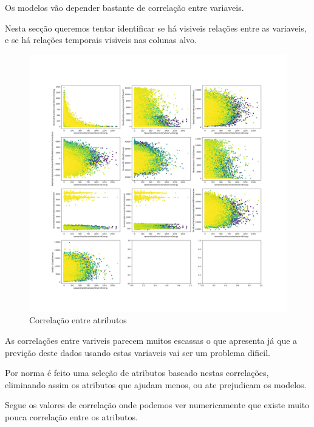 Os modelos vão depender bastante de correlação entre variaveis.

Nesta secção queremos tentar identificar se há visiveis relações entre as variaveis, e se há relações temporais  visiveis nas colunas alvo.



\begin{figure}[H]
  \centering
  \includegraphics[width=\textwidth]{../plots/feature_correlation.png}
  \caption{Correlação entre atributos}
\end{figure}

As correlações entre variveis parecem muitos escassas o que apresenta já que a previção deste dados usando estas variaveis vai ser um problema dificil.

Por norma é feito uma seleção de  atributos baseado nestas correlações, eliminando assim os atributos que ajudam menos, ou ate prejudicam os modelos.

Segue os valores de correlação onde podemos ver numericamente que existe muito pouca correlação entre os atributos.

